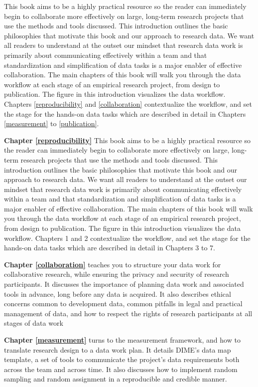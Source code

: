 \documentclass[
]{book}
\begin{document}
This book aims to be a highly practical resource so the reader can immediately begin to collaborate more effectively on large, long-term research projects that use the methods and tools discussed. This introduction outlines the basic philosophies that motivate this book and our approach to research data. We want all readers to understand at the outset our mindset that research data work is primarily about communicating effectively within a team and that standardization and simplification of data tasks is a major enabler of effective collaboration. The main chapters of this book will walk you through the data workflow at each stage of an empirical research project, from design to publication. The figure in this introduction visualizes the data workflow. Chapters \ref{reproducibility} and \ref{collaboration} contextualize the workflow, and set the stage for the hands-on data tasks which are described in detail in Chapters \ref{measurement} to \ref{publication}.

\textbf{Chapter \ref{reproducibility}} This book aims to be a highly practical resource so the reader can immediately begin to collaborate more effectively on large, long-term research projects that use the methods and tools discussed. This introduction outlines the basic philosophies that motivate this book and our approach to research data. We want all readers to understand at the outset our mindset that research data work is primarily about communicating effectively within a team and that standardization and simplification of data tasks is a major enabler of effective collaboration. The main chapters of this book will walk you through the data workflow at each stage of an empirical research project, from design to publication. The figure in this introduction visualizes the data workflow. Chapters 1 and 2 contextualize the workflow, and set the stage for the hands-on data tasks which are described in detail in Chapters 3 to 7.

\textbf{Chapter \ref{collaboration}} teaches you to structure your data work for collaborative research, while ensuring the privacy and security of research participants. It discusses the importance of planning data work and associated tools in advance, long before any data is acquired. It also describes ethical concerns common to development data, common pitfalls in legal and practical management of data, and how to respect the rights of research participants at all stages of data work

\textbf{Chapter \ref{measurement}} turns to the measurement framework, and how to translate research design to a data work plan. It details DIME's data map template, a set of tools to communicate the project's data requirements both across the team and across time. It also discusses how to implement random sampling and random assignment in a reproducible and credible manner.
\end{document}
